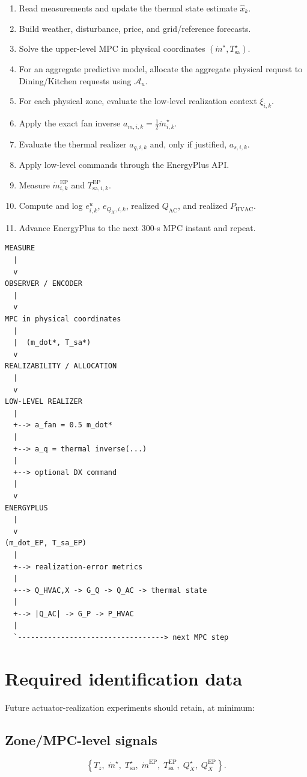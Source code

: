 \documentclass[11pt]{article}
\newcommand{\mdot}{\dot m}
\newcommand{\Qac}{Q_{\mathrm{AC}}}
\newcommand{\Phvac}{P_{\mathrm{HVAC}}}
\begin{document}
\begin{enumerate}[leftmargin=2em]
\item Read measurements and update the thermal state estimate $\hat x_k$.
\item Build weather, disturbance, price, and grid/reference forecasts.
\item Solve the upper-level MPC in physical coordinates
$(\mdot^\star,T_{\mathrm{sa}}^\star)$.
\item For an aggregate predictive model, allocate the aggregate physical request
to Dining/Kitchen requests using $\mathcal A_u$.
\item For each physical zone, evaluate the low-level realization context
$\xi_{i,k}$.
\item Apply the exact fan inverse
$a_{m,i,k}=\tfrac12\mdot_{i,k}^{\star}$.
\item Evaluate the thermal realizer $a_{q,i,k}$ and, only if justified,
$a_{s,i,k}$.
\item Apply low-level commands through the EnergyPlus API.
\item Measure
$\mdot_{i,k}^{\mathrm{EP}}$ and
$T_{\mathrm{sa},i,k}^{\mathrm{EP}}$.
\item Compute and log $e^u_{i,k}$,
$e_{Q_X,i,k}$, realized $\Qac$, and realized $\Phvac$.
\item Advance EnergyPlus to the next 300-s MPC instant and repeat.
\end{enumerate}

\begin{verbatim}
MEASURE
  |
  v
OBSERVER / ENCODER
  |
  v
MPC in physical coordinates
  |
  |  (m_dot*, T_sa*)
  v
REALIZABILITY / ALLOCATION
  |
  v
LOW-LEVEL REALIZER
  |
  +--> a_fan = 0.5 m_dot*
  |
  +--> a_q = thermal inverse(...)
  |
  +--> optional DX command
  |
  v
ENERGYPLUS
  |
  v
(m_dot_EP, T_sa_EP)
  |
  +--> realization-error metrics
  |
  +--> Q_HVAC,X -> G_Q -> Q_AC -> thermal state
  |
  +--> |Q_AC| -> G_P -> P_HVAC
  |
  `----------------------------------> next MPC step
\end{verbatim}

\section{Required identification data}

Future actuator-realization experiments should retain, at minimum:

\subsection*{Zone/MPC-level signals}
\begin{equation}
\left\{
T_z,\;
\mdot^{\star},\;
T_{\mathrm{sa}}^{\star},\;
\mdot^{\mathrm{EP}},\;
T_{\mathrm{sa}}^{\mathrm{EP}},\;
Q_X^{\star},\;
Q_X^{\mathrm{EP}}
\right\}.
\end{equation}
\end{document}
